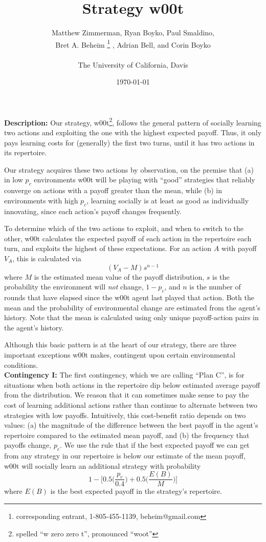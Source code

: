 \documentclass[11pt]{article}
\title{Strategy w00t}
\author{Matthew Zimmerman, Ryan Boyko, Paul Smaldino,\\ Bret A. Beheim
\footnote{corresponding entrant, 1-805-455-1139, beheim@gmail.com} , Adrian Bell, and Corin Boyko\\ \; \\The University of California, Davis}
\date{\today}
\begin{document}
\setlength{\parindent}{20pt}

\maketitle


\textbf{Description:}
Our strategy, w00t\footnote{spelled ``w zero zero t'', pronounced ``woot''}, follows the general pattern of socially learning two actions and exploiting the one with the highest expected payoff.  Thus, it only pays learning costs for (generally) the first two turns, until it has two actions in its repertoire.  

Our strategy acquires these two actions by observation, on the premise that (a) in low $p_c$ environments w00t will be playing with ``good'' strategies that reliably converge on actions with a payoff greater than the mean, while (b) in environments with high $p_c$, learning socially is at least as good as individually innovating, since each action's payoff changes frequently.
 
	To determine which of the two actions to exploit, and when to switch to the other, w00t calculates the expected payoff of each action in the repertoire each turn, and exploits the highest of these expectations.  For an action $A$ with payoff $V_A$, this is calculated via  
	\[(V_A-M)s^{n-1}
\]
	where $M$ is the estimated mean value of the payoff distribution, $s$ is the probability the environment will \textit{not} change, $1-p_c$, and $n$ is the number of rounds that have elapsed since the w00t agent last played that action.  Both the mean and the probability of environmental change are estimated from the agent's history.  Note that the mean is calculated using only unique payoff-action pairs in the agent's history.

Although this basic pattern is at the heart of our strategy, there are three important exceptions w00t makes, contingent upon certain environmental conditions.\\

\textbf{Contingency I:} The first contingency, which we are calling ``Plan C'', is for situations when both actions in the repertoire dip below estimated average payoff from the distribution.  We reason that it can sometimes make sense to pay the cost of learning additional actions rather than continue to alternate between two strategies with low payoffs.  
Intuitively, this cost-benefit ratio depends on two values: (a) the magnitude of the difference between the best payoff in the agent's repertoire compared to the estimated mean payoff, and (b) the frequency that payoffs change, $p_c$.  We use the rule that if the best expected payoff we can get from any strategy in our repertoire is below our estimate of the mean payoff, w00t will socially learn an additional strategy with probability  
	\[1 - \Big[0.5\Big(\frac{p_c}{0.4}\Big)+0.5\Big(\frac{E(B)}{M}\Big)\Big]
\]
where $E(B)$ is the best expected payoff in the strategy's repertoire. 
\end{document}
